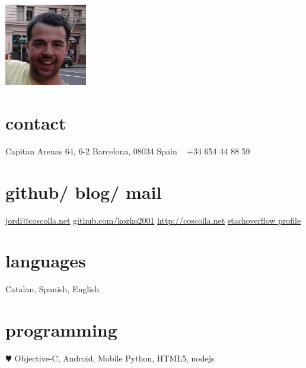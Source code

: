 \documentclass[]{friggeri-cv} %
\begin{document}


\begin{aside} %
\includegraphics[width=3.6cm]{photo}
\section{contact}
Capitan Arenas 64, 6-2
Barcelona, 08034 
Spain
~
+34 654 44 88 59
~
\section{github/ blog/ mail}
\href{mailto:jordi@coscolla.net}{jordi@coscolla.net}
\href{http://github.com/kozko2001}{github.com/kozko2001}
\href{http://www.coscolla.net}{http://coscolla.net}
\href{http://stackoverflow.com/users/1021445/jordi-coscolla}{stackoverflow profile}
\section{languages}
Catalan, Spanish, English
\section{programming}
{\color{red} $\varheartsuit$} Objective-C, Android, Mobile
Python, HTML5, nodejs
\end{aside}

\end{document}

